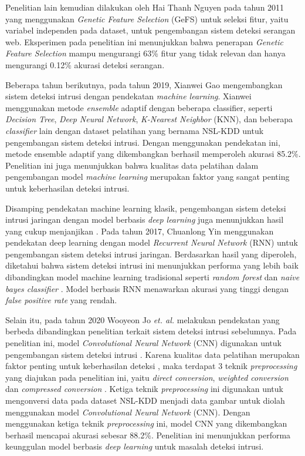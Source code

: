 \documentclass[a4paper,12pt]{report}
\begin{document}
Penelitian lain kemudian dilakukan oleh Hai Thanh Nguyen pada tahun 2011 yang menggunakan \textit{Genetic Feature Selection} (GeFS) untuk seleksi fitur, yaitu variabel independen pada dataset, untuk pengembangan sistem deteksi serangan web. Eksperimen pada penelitian ini menunjukkan bahwa penerapan \textit{Genetic Feature Selection} mampu mengurangi 63\% fitur yang tidak relevan dan hanya mengurangi 0.12\% akurasi deteksi serangan. 

Beberapa tahun berikutnya, pada tahun 2019, Xianwei Gao mengembangkan sistem deteksi intrusi dengan pendekatan \textit{machine learning}. Xianwei menggunakan metode \textit{ensemble} adaptif dengan beberapa classifier, seperti \textit{Decision Tree}, \textit{Deep Neural Network}, \textit{K-Nearest Neighbor} (KNN), dan beberapa \textit{classifier} lain \cite{gaoAdaptiveEnsembleMachine2019} dengan dataset pelatihan yang bernama NSL-KDD \cite{zhaoNSLKDD} untuk pengembangan sistem deteksi intrusi. Dengan menggunakan pendekatan ini, metode ensemble adaptif yang dikembangkan berhasil memperoleh akurasi 85.2\%. Penelitian ini juga menunjukkan bahwa kualitas data pelatihan dalam pengembangan model \textit{machine learning} merupakan faktor yang sangat penting untuk keberhasilan deteksi intrusi. 

Disamping pendekatan machine learning klasik, pengembangan sistem deteksi intrusi jaringan dengan model berbasis \textit{deep learning} juga menunjukkan hasil yang cukup menjanjikan \cite{yinDeepLearningApproach2017}\cite{kasongoDeepLearningTechnique2023}. Pada tahun 2017, Chuanlong Yin menggunakan pendekatan deep learning dengan model \textit{Recurrent Neural Network} (RNN) untuk pengembangan sistem deteksi intrusi jaringan. Berdasarkan hasil yang diperoleh, diketahui bahwa sistem deteksi intrusi ini menunjukkan performa yang lebih baik dibandingkan model machine learning tradisional seperti \textit{random forest} dan \textit{naive bayes classifier} \cite{yinDeepLearningApproach2017}. Model berbasis RNN menawarkan akurasi yang tinggi dengan \textit{false positive rate} yang rendah. 

Selain itu, pada tahun 2020 Wooyeon Jo \textit{et. al.} melakukan pendekatan yang berbeda dibandingkan penelitian terkait sistem deteksi intrusi sebelumnya. Pada penelitian ini, model \textit{Convolutional Neural Network} (CNN) digunakan untuk pengembangan sistem deteksi intrusi \cite{joPacketPreprocessingCNNBased2020}. Karena kualitas data pelatihan merupakan faktor penting untuk keberhasilan deteksi \cite{gaoAdaptiveEnsembleMachine2019}, maka terdapat 3 teknik \textit{preprocessing} yang diajukan pada penelitian ini, yaitu \textit{direct conversion}, \textit{weighted conversion} dan \textit{compressed conversion} \cite{joPacketPreprocessingCNNBased2020}. Ketiga teknik \textit{preprocessing} ini digunakan untuk mengonversi data pada dataset NSL-KDD \cite{zhaoNSLKDD} menjadi data gambar untuk diolah menggunakan model \textit{Convolutional Neural Network} (CNN). Dengan menggunakan ketiga teknik \textit{preprocessing} ini, model CNN yang dikembangkan berhasil mencapai akurasi sebesar 88.2\%. Penelitian ini menunjukkan performa keunggulan model berbasis \textit{deep learning} untuk masalah deteksi intrusi.
\end{document}
